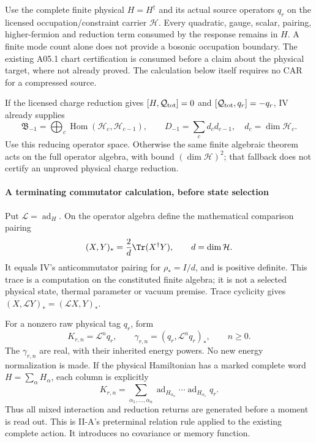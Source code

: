 \documentclass[12pt,a4paper]{article}
\begin{document}
Use the complete finite physical $H=H^\dagger$ and its actual source
operators $q_r$ on the licensed occupation/constraint carrier $\mathcal H$.
Every quadratic, gauge, scalar, pairing, higher-fermion and reduction term
consumed by the response remains in $H$. A finite mode count alone does not
provide a bosonic occupation boundary. The existing A05.1 chart certification
is consumed before a claim about the physical target, where not already proved.
The calculation below itself requires no CAR for a compressed source.

If the licensed charge reduction gives $[H,\mathcal Q_{\rm tot}]=0$ and
$[\mathcal Q_{\rm tot},q_r]=-q_r$, IV already supplies
\[
 \mathfrak B_{-1}=\bigoplus_c\operatorname{Hom}(\mathcal H_c,\mathcal H_{c-1}),
 \qquad D_{-1}=\sum_c d_c d_{c-1},\quad d_c=\dim\mathcal H_c.
\]
Use this reducing operator space. Otherwise the same finite algebraic theorem
acts on the full operator algebra, with bound $(\dim\mathcal H)^2$; that
fallback does not certify an unproved physical charge reduction.



\paragraph{A terminating commutator calculation, before state selection}
Put $\mathcal L=\operatorname{ad}_H$. On the operator algebra define the mathematical
comparison pairing
\[
 (X,Y)_*=\frac{2}{d}\Tr(X^\dagger Y),\qquad d=\dim\mathcal H.
\]
It equals IV's anticommutator pairing for $\rho_*=I/d$, and is positive
definite. This trace is a computation on the constituted finite algebra;
it is not a selected physical state, thermal parameter or vacuum premise.
Trace cyclicity gives $(X,\mathcal LY)_*=(\mathcal LX,Y)_*$.

For a nonzero raw physical tag $q_r$, form
\[
 K_{r,n}=\mathcal L^n q_r,\qquad
 \gamma_{r,n}=(q_r,\mathcal L^nq_r)_*,\qquad n\geq0.
\]
The $\gamma_{r,n}$ are real, with their inherited energy powers. No new
energy normalization is made. If the physical Hamiltonian has a marked
complete word $H=\sum_\alpha H_\alpha$, each column is explicitly
\begin{equation}
 K_{r,n}=\sum_{\alpha_1,\ldots,\alpha_n}
 \operatorname{ad}_{H_{\alpha_n}}\cdots\operatorname{ad}_{H_{\alpha_1}}q_r.
 \label{p4:eq:v2169-b7-p1}
\end{equation}
Thus all mixed interaction and reduction returns are generated before a
moment is read out. This is II-A's preterminal relation rule applied to the
existing complete action. It introduces no covariance or memory function.
\end{document}
